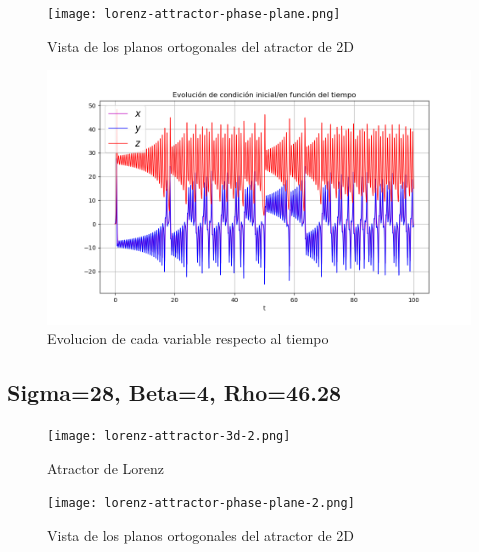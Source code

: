 \documentclass[12pt]{article}
\begin{document}
\begin{figure}
\begin{centering}
  \texttt{[image: lorenz-attractor-phase-plane.png]}
  \caption{Vista de los planos ortogonales del atractor de 2D}
\end{centering}
\end{figure}

\begin{figure}
\begin{centering}
  \includegraphics[scale = 0.65]{Evolucion1.png}
  \caption{Evolucion de cada variable respecto al tiempo}
\end{centering}
\end{figure}

\subsection{Sigma=28, Beta=4, Rho=46.28}

\begin{figure}
\begin{centering}
  \texttt{[image: lorenz-attractor-3d-2.png]}
  \caption{Atractor de Lorenz}
\end{centering}
\end{figure}

\begin{figure}
\begin{centering}
  \texttt{[image: lorenz-attractor-phase-plane-2.png]}
  \caption{Vista de los planos ortogonales del atractor de 2D}
\end{centering}
\end{figure}
\end{document}
